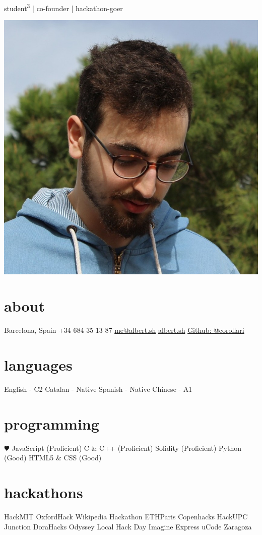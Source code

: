 \documentclass[]{friggeri-cv}
\begin{document}
       {student\textsuperscript{3} | co-founder | hackathon-goer}

\begin{aside}
  \includegraphics[width=\textwidth]{me.jpg}
  \section{about}
    Barcelona, Spain
    +34 684 35 13 87
    \href{mailto:me@albert.sh}{me@albert.sh}
    \href{https://albert.sh}{albert.sh}
    \href{https://github.com/corollari}{Github: @corollari}
  \section{languages}
    English - C2
    Catalan - Native
    Spanish - Native
    Chinese - A1
  \section{programming}
    {\color{red} $\varheartsuit$} JavaScript (Proficient)
    C \& C++ (Proficient)
    Solidity (Proficient)
    Python (Good)
    HTML5 \& CSS (Good)
  \section{hackathons}
HackMIT
OxfordHack
Wikipedia Hackathon
ETHParis
Copenhacks
HackUPC
Junction
DoraHacks
Odyssey
Local Hack Day
Imagine Express
uCode Zaragoza
\end{aside}
%
\end{document}
